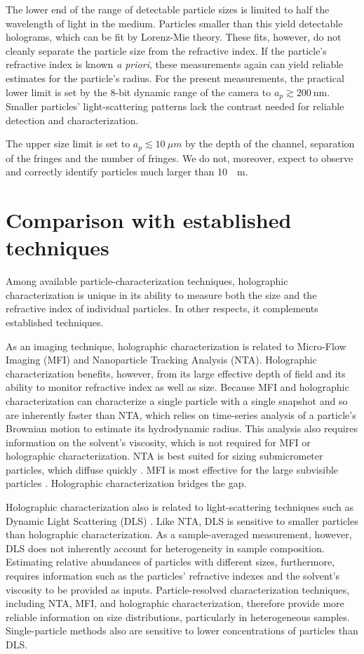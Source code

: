The lower end of the range of detectable particle sizes is
limited to half the wavelength of light in the medium.
Particles smaller than this yield detectable holograms, which can be fit by Lorenz-Mie theory.  These fits, however, do not cleanly separate the particle size from the refractive index.  If the particle's
refractive index is known \emph{a priori}, these measurements
again can yield reliable estimates for the particle's radius.
For the present measurements, the practical lower limit is set by the 8-bit dynamic range of the camera to $a_p \gtrsim \SI{200}{\nm}$. Smaller particles' light-scattering patterns lack the contrast needed for reliable detection and characterization.

The upper size limit is set to $a_p \lesssim \SI{10}{\mu m}$ by the depth of the channel, separation of the fringes and the number of fringes.  We do not, moreover, expect to observe and correctly identify particles much larger than \SI{10}{\mu m}.


\section{Comparison with established techniques}
\label{sec:comparison}

Among available particle-characterization techniques, holographic characterization is unique in its ability to measure both the
size and the refractive index of individual particles. In other 
respects, it complements established techniques.

As an imaging technique, holographic characterization is related to 
Micro-Flow Imaging (MFI) and Nanoparticle Tracking Analysis (NTA). Holographic characterization benefits, however, from its large effective depth of field and its ability to monitor refractive index as well as size. Because MFI and holographic characterization can characterize a single particle with a single snapshot and so are inherently faster than NTA, which relies on time-series analysis of a particle's Brownian motion to estimate its hydrodynamic radius. This analysis also requires information on the solvent's viscosity, which is not required for MFI or holographic characterization. NTA is best suited for sizing submicrometer particles, which diffuse quickly \cite{filipe10}. MFI is most effective for the large subvisible particles \cite{sharma15}. Holographic characterization bridges the gap.

Holographic characterization also is related to light-scattering
techniques such as Dynamic Light Scattering (DLS) \cite{filipe10}.
Like NTA, DLS is sensitive to smaller particles than holographic 
characterization. As a sample-averaged measurement, however, 
DLS does not inherently account for heterogeneity in sample composition. 
Estimating relative abundances of particles with different sizes,
furthermore, requires information such as the particles' refractive
indexes and the solvent's viscosity to be provided as inputs.
Particle-resolved characterization techniques, including NTA, MFI,
and holographic characterization, therefore provide more reliable
information on size distributions, particularly in heterogeneous
samples. Single-particle methods also are sensitive to lower 
concentrations of particles than DLS.

